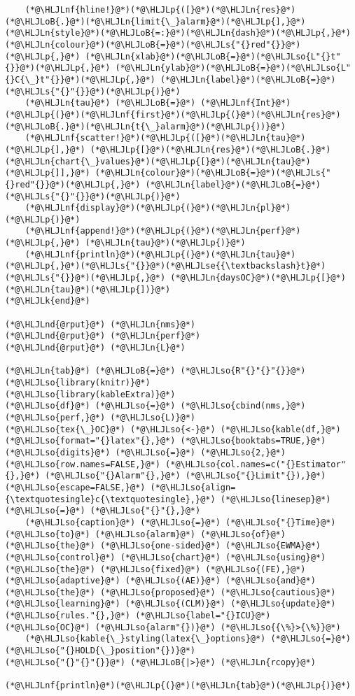 \documentclass[12pt,a4paper]{article}
\newcommand{\HLJLk}[1]{\textcolor[RGB]{148,91,176}{\textbf{#1}}}
\newcommand{\HLJLn}[1]{#1}
\newcommand{\HLJLnd}[1]{\textcolor[RGB]{214,102,97}{#1}}
\newcommand{\HLJLnf}[1]{\textcolor[RGB]{66,102,213}{#1}}
\newcommand{\HLJLs}[1]{\textcolor[RGB]{201,61,57}{#1}}
\newcommand{\HLJLse}[1]{\textcolor[RGB]{59,151,46}{#1}}
\newcommand{\HLJLso}[1]{\textcolor[RGB]{201,61,57}{#1}}
\newcommand{\HLJLoB}[1]{\textcolor[RGB]{102,102,102}{\textbf{#1}}}
\newcommand{\HLJLp}[1]{#1}
\begin{document}
\begin{lstlisting}
    (*@\HLJLnf{hline!}@*)(*@\HLJLp{([}@*)(*@\HLJLn{res}@*)(*@\HLJLoB{.}@*)(*@\HLJLn{limit{\_}alarm}@*)(*@\HLJLp{],}@*) (*@\HLJLn{style}@*)(*@\HLJLoB{=:}@*)(*@\HLJLn{dash}@*)(*@\HLJLp{,}@*) (*@\HLJLn{colour}@*)(*@\HLJLoB{=}@*)(*@\HLJLs{"{}red"{}}@*)(*@\HLJLp{,}@*) (*@\HLJLn{xlab}@*)(*@\HLJLoB{=}@*)(*@\HLJLso{L"{}t"{}}@*)(*@\HLJLp{,}@*) (*@\HLJLn{ylab}@*)(*@\HLJLoB{=}@*)(*@\HLJLso{L"{}C{\_}t"{}}@*)(*@\HLJLp{,}@*) (*@\HLJLn{label}@*)(*@\HLJLoB{=}@*)(*@\HLJLs{"{}"{}}@*)(*@\HLJLp{)}@*)
    (*@\HLJLn{tau}@*) (*@\HLJLoB{=}@*) (*@\HLJLnf{Int}@*)(*@\HLJLp{(}@*)(*@\HLJLnf{first}@*)(*@\HLJLp{(}@*)(*@\HLJLn{res}@*)(*@\HLJLoB{.}@*)(*@\HLJLn{t{\_}alarm}@*)(*@\HLJLp{))}@*)
    (*@\HLJLnf{scatter!}@*)(*@\HLJLp{([}@*)(*@\HLJLn{tau}@*)(*@\HLJLp{],}@*) (*@\HLJLp{[}@*)(*@\HLJLn{res}@*)(*@\HLJLoB{.}@*)(*@\HLJLn{chart{\_}values}@*)(*@\HLJLp{[}@*)(*@\HLJLn{tau}@*)(*@\HLJLp{]],}@*) (*@\HLJLn{colour}@*)(*@\HLJLoB{=}@*)(*@\HLJLs{"{}red"{}}@*)(*@\HLJLp{,}@*) (*@\HLJLn{label}@*)(*@\HLJLoB{=}@*)(*@\HLJLs{"{}"{}}@*)(*@\HLJLp{)}@*)
    (*@\HLJLnf{display}@*)(*@\HLJLp{(}@*)(*@\HLJLn{pl}@*)(*@\HLJLp{)}@*)
    (*@\HLJLnf{append!}@*)(*@\HLJLp{(}@*)(*@\HLJLn{perf}@*)(*@\HLJLp{,}@*) (*@\HLJLn{tau}@*)(*@\HLJLp{)}@*)
    (*@\HLJLnf{println}@*)(*@\HLJLp{(}@*)(*@\HLJLn{tau}@*)(*@\HLJLp{,}@*)(*@\HLJLs{"{}}@*)(*@\HLJLse{{\textbackslash}t}@*)(*@\HLJLs{"{}}@*)(*@\HLJLp{,}@*) (*@\HLJLn{daysOC}@*)(*@\HLJLp{[}@*)(*@\HLJLn{tau}@*)(*@\HLJLp{])}@*)
(*@\HLJLk{end}@*)

(*@\HLJLnd{@rput}@*) (*@\HLJLn{nms}@*)
(*@\HLJLnd{@rput}@*) (*@\HLJLn{perf}@*)
(*@\HLJLnd{@rput}@*) (*@\HLJLn{L}@*)

(*@\HLJLn{tab}@*) (*@\HLJLoB{=}@*) (*@\HLJLso{R"{}"{}"{}}@*)
(*@\HLJLso{library(knitr)}@*)
(*@\HLJLso{library(kableExtra)}@*)
(*@\HLJLso{df}@*) (*@\HLJLso{=}@*) (*@\HLJLso{cbind(nms,}@*) (*@\HLJLso{perf,}@*) (*@\HLJLso{L)}@*)
(*@\HLJLso{tex{\_}OC}@*) (*@\HLJLso{<-}@*) (*@\HLJLso{kable(df,}@*) (*@\HLJLso{format="{}latex"{},}@*) (*@\HLJLso{booktabs=TRUE,}@*) (*@\HLJLso{digits}@*) (*@\HLJLso{=}@*) (*@\HLJLso{2,}@*) (*@\HLJLso{row.names=FALSE,}@*) (*@\HLJLso{col.names=c("{}Estimator"{},}@*) (*@\HLJLso{"{}Alarm"{},}@*) (*@\HLJLso{"{}Limit"{}),}@*) (*@\HLJLso{escape=FALSE,}@*) (*@\HLJLso{align={\textquotesingle}c{\textquotesingle},}@*) (*@\HLJLso{linesep}@*) (*@\HLJLso{=}@*) (*@\HLJLso{"{}"{},}@*)
    (*@\HLJLso{caption}@*) (*@\HLJLso{=}@*) (*@\HLJLso{"{}Time}@*) (*@\HLJLso{to}@*) (*@\HLJLso{alarm}@*) (*@\HLJLso{of}@*) (*@\HLJLso{the}@*) (*@\HLJLso{one-sided}@*) (*@\HLJLso{EWMA}@*) (*@\HLJLso{control}@*) (*@\HLJLso{chart}@*) (*@\HLJLso{using}@*) (*@\HLJLso{the}@*) (*@\HLJLso{fixed}@*) (*@\HLJLso{(FE),}@*) (*@\HLJLso{adaptive}@*) (*@\HLJLso{(AE)}@*) (*@\HLJLso{and}@*) (*@\HLJLso{the}@*) (*@\HLJLso{proposed}@*) (*@\HLJLso{cautious}@*) (*@\HLJLso{learning}@*) (*@\HLJLso{(CLM)}@*) (*@\HLJLso{update}@*) (*@\HLJLso{rules."{},}@*) (*@\HLJLso{label="{}ICU}@*) (*@\HLJLso{OC}@*) (*@\HLJLso{alarm"{})}@*) (*@\HLJLso{{\%}>{\%}}@*)
    (*@\HLJLso{kable{\_}styling(latex{\_}options}@*) (*@\HLJLso{=}@*) (*@\HLJLso{"{}HOLD{\_}position"{})}@*)
(*@\HLJLso{"{}"{}"{}}@*) (*@\HLJLoB{|>}@*) (*@\HLJLn{rcopy}@*)

(*@\HLJLnf{println}@*)(*@\HLJLp{(}@*)(*@\HLJLn{tab}@*)(*@\HLJLp{)}@*)
\end{lstlisting}
\end{document}
